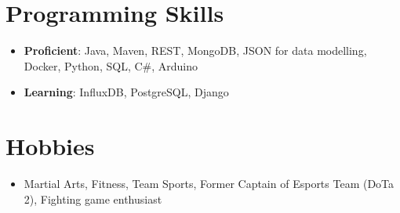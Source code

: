 \documentclass[letterpaper,11pt]{article}
\newcommand{\resumeSubHeadingListStart}{\begin{itemize}[leftmargin=*]}
\newcommand{\resumeSubHeadingListEnd}{\end{itemize}}
\begin{document}
%
\section{Programming Skills}
  \resumeSubHeadingListStart
	\item{
	\textbf{Proficient}{: Java, Maven, REST, MongoDB, JSON for data modelling, Docker, Python, SQL, C\#, Arduino}
    	}
	\item{
		\textbf{Learning}{: InfluxDB, PostgreSQL, Django}
	}
  \resumeSubHeadingListEnd

\section{Hobbies}
	\resumeSubHeadingListStart
	\item{
	\textbf{}{Martial Arts, Fitness, Team Sports, Former Captain of Esports Team (DoTa 2), Fighting game enthusiast }
	}
	\resumeSubHeadingListEnd
\end{document}

